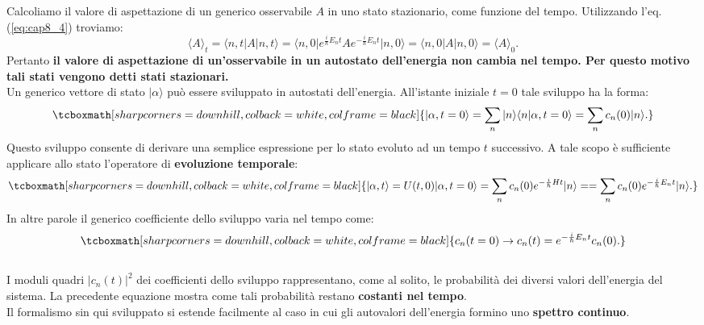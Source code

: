 \documentclass[a4paper,12pt,oneside]{book}
\begin{document}
Calcoliamo il valore di aspettazione di un generico osservabile $A$ in uno stato stazionario, come funzione del tempo. Utilizzando l'eq.(\ref{eq:cap8_4}) troviamo:
	\begin{equation}
		\langle A \rangle _t = \langle n, t \vert A \vert n, t \rangle= \langle n, 0 \vert e^{\frac{i}{\hbar}E_n t}A e^{-\frac{i}{\hbar}E_n t}\vert n, 0 \rangle =\langle n, 0 \vert A \vert n, 0 \rangle = \langle A \rangle _0.
	\end{equation}
Pertanto \textbf{il valore di aspettazione di un'osservabile in un autostato dell'energia non cambia nel tempo. Per questo motivo tali stati vengono detti stati stazionari.}\\

Un generico vettore di stato $\vert \alpha \rangle $ può essere sviluppato in autostati dell'energia. All'istante iniziale $t=0$ tale sviluppo ha la forma:
	\begin{equation}
		\tcboxmath[sharp corners=downhill, colback=white, colframe=black]{
			\vert \alpha , t=0\rangle = \sum _n \vert n \rangle \langle n \vert \alpha, t=0 \rangle = \sum _n c_n(0)\vert n \rangle.
			}
	\end{equation}
Questo sviluppo consente di derivare una semplice espressione per lo stato evoluto ad un tempo $t$ successivo. A tale scopo è sufficiente applicare allo stato l'operatore di \textbf{evoluzione temporale}:
	\begin{equation}
		\tcboxmath[sharp corners=downhill, colback=white, colframe=black]{
			\vert \alpha, t \rangle = U (t,0)\vert \alpha, t=0 \rangle = \sum _n c_n (0) e^{-\frac{i}{\hbar}H t}  \vert n \rangle =  =\sum _n c_n (0) e^{-\frac{i}{\hbar}E_n t}  \vert n \rangle.
			}
	\end{equation}
In altre parole il generico coefficiente dello sviluppo varia nel tempo come:
	\begin{equation}
		\tcboxmath[sharp corners=downhill, colback=white, colframe=black]{
			c_n (t=0) \rightarrow c_n(t)=e^{-\frac{i}{\hbar}E_n t} c_n (0).
			}
	\end{equation}\\
	
I moduli quadri $\vert c_n(t)\vert^2$ dei coefficienti dello sviluppo rappresentano, come al solito, le probabilità dei diversi valori dell'energia del sistema. La precedente equazione mostra come tali probabilità restano \textbf{costanti nel tempo}.\\

Il formalismo sin qui sviluppato si estende facilmente al caso in cui gli autovalori dell'energia formino uno \textbf{spettro continuo}.
\end{document}
